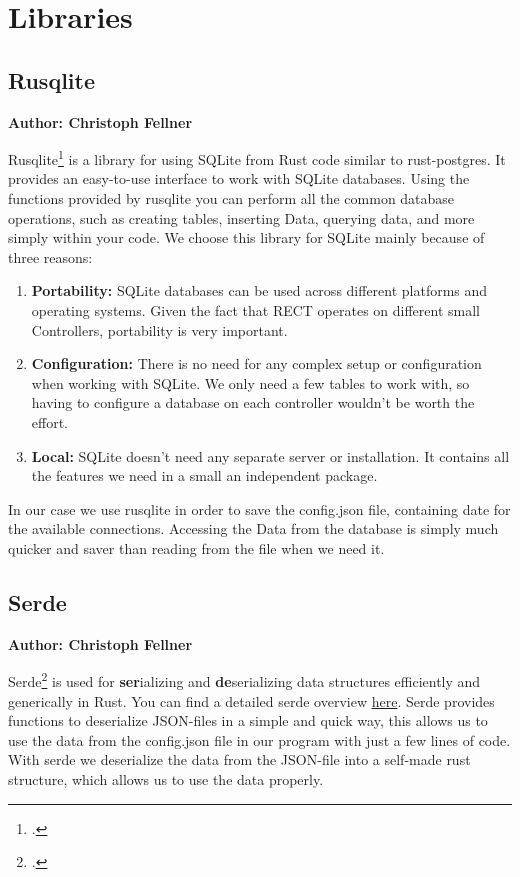 \section{Libraries}

\subsection{Rusqlite}
\textbf{Author: Christoph Fellner}

Rusqlite\footcite{rusqlite} is a library for using SQLite from Rust code similar to rust-postgres. It provides an easy-to-use interface to work with SQLite databases. Using 
the functions provided by rusqlite you can perform all the common database operations, such as creating tables, inserting Data, querying data, and more simply within your code. 
We choose this library for SQLite mainly because of three reasons:
\begin{enumerate}
    \item \textbf{Portability:} SQLite databases can be used across different platforms and operating systems. Given the fact that RECT operates on different small Controllers, portability is very important.
    \item \textbf{Configuration:} There is no need for any complex setup or configuration when working with SQLite. We only need a few tables to work with, so having to configure a database on each controller wouldn't be worth the effort.
    \item \textbf{Local:} SQLite doesn't need any separate server or installation. It contains all the features we need in a small an independent package.
\end{enumerate}

In our case we use rusqlite in order to save the config.json file, containing date for the available connections. Accessing the Data from the database is simply much quicker 
and saver than reading from the file when we need it. 

\subsection{Serde}
\textbf{Author: Christoph Fellner}

Serde\footcite{serde} is used for \textbf{ser}ializing and \textbf{de}serializing data structures efficiently and generically in Rust. You can find a detailed serde overview 
\href{https://serde.rs/}{here}.
Serde provides functions to deserialize JSON-files in a simple and quick way, this allows us to use the data from the config.json file in our program with just a few lines 
of code. With serde we deserialize the data from the JSON-file into a self-made rust structure, which allows us to use the data properly.  

